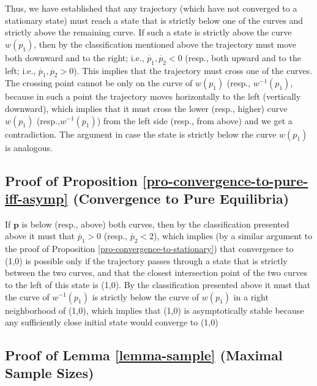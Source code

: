 \documentclass[12pt]{article}
\numberwithin{equation}{section}
\numberwithin{figure}{section}
\theoremstyle{definition}
\theoremstyle{plain}
\theoremstyle{plain}
\theoremstyle{plain}
\theoremstyle{remark}
\theoremstyle{plain}
\theoremstyle{plain}
\begin{document}
Thus, we have established that any trajectory (which have not converged to a stationary state) must reach a state that is strictly below one of the curves and strictly above the remaining curve. If such a state is strictly above the curve $w(p_1)$, then by the classification mentioned above the trajectory must move both downward and to the right; i.e., $\dot{p_1},\dot{p_2}<0$ (resp., both upward and to the left; i.e., $\dot{p_1},\dot{p_2}>0$). This implies that the trajectory must cross one of the curves. The crossing point cannot be only on the curve of $w(p_1)$ (resp., $w^{-1}(p_1)$, because in such a point the trajectory moves horizontally to the left (vertically downward), which implies that it must cross the lower (resp., higher)  curve $w(p_1)$ (resp.,$w^{-1}(p_1)$) from the left side (resp., from above) and we get a contradiction. The argument in case the state is strictly below rhe curve $w(p_1)$ is analogous.
 
\subsection{Proof of Proposition \ref{pro-convergence-to-pure-iff-asymp} (Convergence to Pure Equilibria)}\label{proof-converge-pure-iss-asymp}
 If $\textbf{p}$ is below  (resp., above) both curves, then by the classification presented above it must that $\dot{p_1}>0$ (resp., $\dot{p_2}<2$), which implies (by a similar argument to the proof of Proposition \ref{pro-convergence-to-stationary}) that convergence to (1,0) is possible only if the trajectory passes through a state that is strictly between the two curves, and that the closest intersection point of the two curves to the left of this state is (1,0). By the classification presented above it must that the curve of $w^{-1}(p_1)$ is strictly below the curve of $w(p_1)$ in a right neighborhood of (1,0), which implies that (1,0) is asymptotically stable because any sufficiently close initial state would converge to (1,0)
\subsection {Proof of Lemma \ref{lemma-sample} (Maximal Sample Sizes)}\label{lem-proof}
\end{document}
